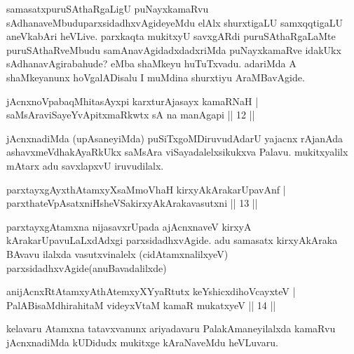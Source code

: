 \begin{artha}
samasatxpuruSAthaRgaLigU puNayxkamaRvu sAdhanaveMbudu\break parxsidadhxvAgideyeMdu elAlx shurxtigaLU samxqqtigaLU aneVkabAri heVLive. parxkaqta mukitxyU savxgARdi puruSAthaRgaLaMte puruSAthaRveMbudu samAnavAgidadxdadxriMda puNayxkamaRve idakUkx sAdhanavAgirabahude? eMba shaMkeyu huTuTxvadu. adariMda A shaMkeyanunx hoVgalADisalu I muMdina shurxtiyu AraMBavAgide.
\end{artha}


\begin{shl}
jAcnxnoVpabaqMhitasAyxpi karxturAjasayx kamaRNaH |\\
saMsAraviSayeYvA\s \s pitxmaRkwtx sA na manAgapi \hfill || 12 ||
\end{shl}

\begin{artha}
jAcnxnadiMda (upAsaneyiMda) puSiTxgoMDiruvudAdarU yajacnx rAjanAda ashavxmeVdhakAyaRkUkx saMsAra viSayadalelxsikukxva Palavu. mukitxyalilx mAtarx adu savxlapxvU iruvudilalx.
\end{artha}


\begin{shl}
parxtayxgAyxthAtamxyXsaMmoVhaH kirxyAkArakarUpavAnf |\\
parxthateV\s pAsatxniHsheVSakirxyAkArakavasutxni \hfill || 13 ||
\end{shl}

\begin{artha}
parxtayxgAtamxna nijasavxrUpada ajAcnxnaveV kirxyA kArakarUpavuLaLxdAdxgi parxsidadhxvAgide. adu samasatx kirxyAkAraka BAvavu ilalxda vasutxvinalelx (cidAtamxnalilxyeV) parxsidadhxvAgide(anuBavadalilxde)
\end{artha}


\begin{shl}
anijAcnxRtAtamxyAthAtemxyXYyaRtutx keYshicxdihoVcayxteV |\\
PalABisaMdhirahitaM videyxVtaM kamaR mukatxyeV \hfill || 14 ||
\end{shl}

\begin{artha}
kelavaru Atamxna tatavxvanunx ariyadavaru PalakAmaneyilalxda kamaRvu jAcnxnadiMda kUDidudx mukitxge kAraNaveMdu heVLuvaru.
\end{artha}

